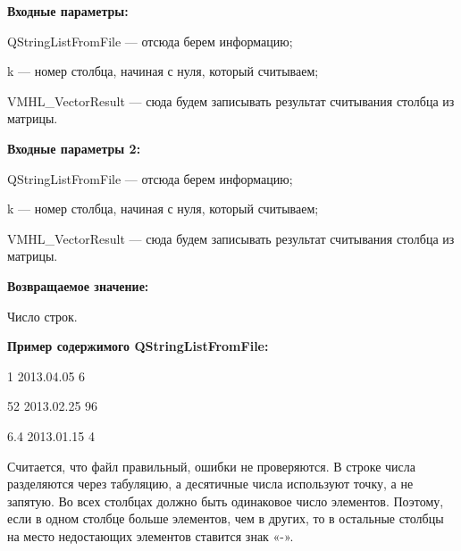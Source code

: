 \textbf{Входные параметры:}

QStringListFromFile --- отсюда берем информацию;
 
    k --- номер столбца, начиная с нуля, который считываем;
 
    VMHL\_VectorResult --- сюда будем записывать результат считывания столбца из матрицы.
	
\textbf{Входные параметры 2:}
	
	 QStringListFromFile --- отсюда берем информацию;
 
    k --- номер столбца, начиная с нуля, который считываем;
 
    VMHL\_VectorResult --- сюда будем записывать результат считывания столбца из матрицы.

\textbf{Возвращаемое значение:}

Число строк.

\textbf{Пример содержимого QStringListFromFile:}

1	2013.04.05	6

52	2013.02.25	96

6.4	2013.01.15	4

Считается, что файл правильный, ошибки не проверяются. В строке числа разделяются через табуляцию, а десятичные числа используют точку, а не запятую. Во всех столбцах должно быть одинаковое число элементов. Поэтому, если в одном столбце больше элементов, чем в других, то в остальные столбцы на место недостающих элементов ставится знак «-».